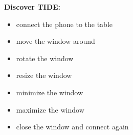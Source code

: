 \documentclass[11pt]{amsart}
\begin{document}
\fontsize{35}{50}\bfseries
Discover TIDE:
\begin{itemize}
\item connect the phone to the table
\item move the window around
\item rotate the window
\item resize the window
\item minimize the window
\item maximize the window
\item close the window and connect again
\end{itemize}
\end{document}
